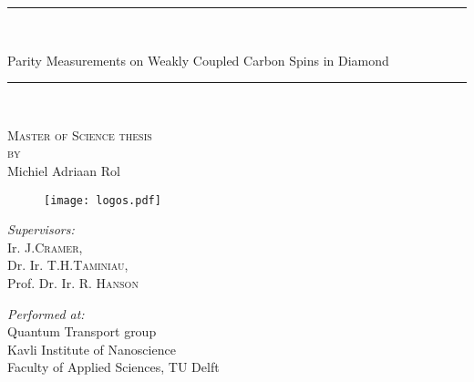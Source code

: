 \documentclass[a4paper,10pt]{report}
\begin{document}
\newcommand{\HRule}{\rule{\linewidth}{0.5mm}}

\thispagestyle{empty}
\HRule \\[0cm]
\begin{center}
	\Huge{\textsf{Parity Measurements on Weakly Coupled Carbon Spins in Diamond}}
\end{center}
\vspace{0.25cm}
\HRule \\[0cm]
\vspace{0.15in}



\begin{figure}[h]

\end{figure}
\vspace{0.15cm}
\begin{center}
\textsc{Master of Science thesis}\\
\textsc{by} \\
\LARGE{\textsf{Michiel Adriaan Rol}}
\end{center}

\begin{figure}[h]
	\centering
	\texttt{[image: logos.pdf]}
\end{figure}
\vspace{0.2in}

\begin{minipage}{0.5\textwidth}
\begin{flushleft} \large
\emph{Supervisors:}\\
Ir. J.\textsc{Cramer}, \\
Dr. Ir. T.H.\textsc{Taminiau}, \\
Prof. Dr. Ir. R. \textsc{Hanson}
\end{flushleft}
\end{minipage}
\begin{minipage}{0.5\textwidth}
\begin{flushright} \large
\emph{Performed at:} \\
Quantum Transport group \\
Kavli Institute of Nanoscience \\
Faculty of Applied Sciences, TU Delft
\end{flushright}
\end{minipage}





\normalsize

\newpage
\end{document}
